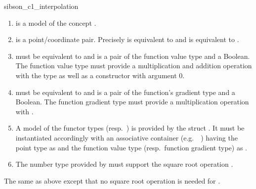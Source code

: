 \begin{ccRefFunction}{sibson_c1_interpolation}
\begin{enumerate}
\item  {} is a model of the concept 
  .
\item {} is a point/coordinate pair.
  Precisely  is
  equivalent to  and
   is equivalent to
  .
\item {} must be equivalent to
   and  is a pair of
  the function value type and a Boolean. The function value type must
  provide a multiplication and addition operation with the type
   as well as a constructor with argument $0$.
\item {} must be equivalent to
   and  is a pair of
  the function's gradient type and a Boolean. The
  function gradient type must provide a multiplication operation with
  .
\item A model of the functor types  (resp.\ 
  ) is provided by the struct . It
  must be instantiated accordingly with an associative container
  (e.g.\ \stl\ \ccc{std::map}) having the point type as 
  and the function value type (resp.\ function gradient type) as
  \ccc{mapped_type}.
\item The number type  provided by  must support
  the square root operation \ccc{sqrt()}.
\end{enumerate}

 {The same as above except that no square root
  operation is needed for \ccc{FT}.}


\end{ccRefFunction}
